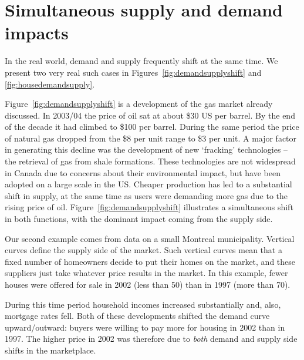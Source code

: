 \section{Simultaneous supply and demand impacts}\label{sec:ch3sec6}

In the real world, demand and supply frequently shift at the same time. We present two very real such cases in Figures~\ref{fig:demandsupplyshift} and \ref{fig:housedemandsupply}.

Figure~\ref{fig:demandsupplyshift} is a development of the gas market already discussed. In 2003/04 the price of oil sat at about \$30 US per barrel. By the end of the decade it had climbed to \$100 per barrel. During the same period the price of natural gas dropped from the \$8 per unit range to \$3 per unit. A major factor in generating this decline was the development of new `fracking' technologies -- the retrieval of gas from shale formations. These technologies are not widespread in Canada due to concerns about their environmental impact, but have been adopted on a large scale in the US. Cheaper production has led to a substantial shift in supply, at the same time as users were demanding more gas due to the rising price of oil. Figure~\ref{fig:demandsupplyshift} illustrates a simultaneous shift in both functions, with the dominant impact coming from the supply side.

Our second example comes from data on a small Montreal municipality. Vertical curves define the supply side of the market. Such vertical curves mean that a fixed number of homeowners decide to put their homes on the market, and these suppliers just take whatever price results in the market. In this example, fewer houses were offered for sale in 2002 (less than 50) than in 1997 (more than 70). 

During this time period household incomes increased substantially and, also, mortgage rates fell. Both of these developments shifted the demand curve upward/outward: buyers were willing to pay more for housing in 2002 than in 1997. The higher price in 2002 was therefore due to \textit{both} demand and supply side shifts in the marketplace. 




